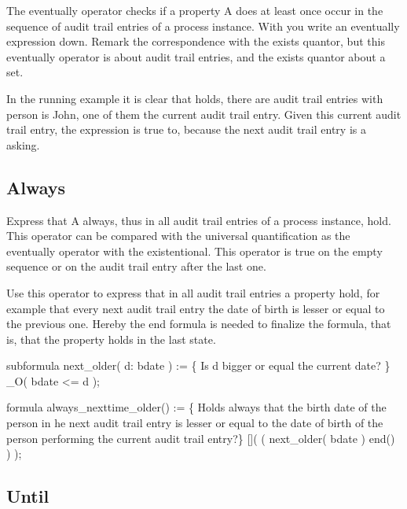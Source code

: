 The eventually operator checks if a property A does at least once occur in the
sequence of audit trail entries of a process instance. With 
you write an eventually expression down. Remark the correspondence with the
exists quantor, but this eventually operator  is about audit trail entries,
and the exists quantor about a set.

In the running example it is clear that  holds,
there are audit trail entries with person is John, one of them the current
audit trail entry. Given this current audit trail entry, the expression
 is true to, because the next audit trail entry
is a asking.

\subsection{Always}
\label{language:always}

 Express that A always, thus in all audit trail entries of a
process instance, hold. This operator can be compared with the universal quantification
as the eventually operator with the existentional. This operator is true on
the empty sequence or on the audit trail entry after the last one.

Use this operator to express that in all audit trail entries a property hold,
for example that every next audit trail entry the date of birth is lesser or
equal to the previous one. Hereby the end formula is needed to finalize the
formula, that is, that the property holds in the last state.

\begin{ltlcode}

subformula next_older( d: bdate ) := \{
 Is d bigger or equal the current date? \}
  _O( bdate <= d );

formula always\_nexttime\_older() := \{
 Holds always that the birth date of the person in he next audit trail entry is
 lesser or equal to the date of birth of the person performing the current
 audit trail entry?\}
  []( ( next_older( bdate ) \/ end() ) );
\end{ltlcode}

\subsection{Until}
\label{language:until}

